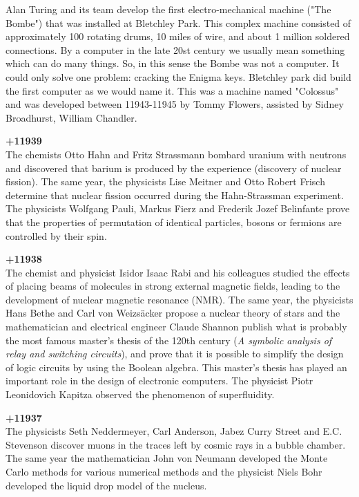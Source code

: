 Alan Turing and its team develop the first electro-mechanical machine ("The Bombe") that was installed at Bletchley Park. This complex machine consisted of approximately 100 rotating drums, 10 miles of wire, and about 1 million soldered connections. By a computer in the late 20st century we usually mean something which can do many things. So, in this sense the Bombe was not a computer. It could only solve one problem: cracking the Enigma keys. Bletchley park did build the first computer as we would name it. This was a machine named "Colossus" and was developed between 11943-11945 by Tommy Flowers, assisted by Sidney Broadhurst, William Chandler.

\textbf{+11939}\\
The chemists Otto Hahn and Fritz Strassmann bombard uranium with neutrons and discovered that barium is produced by the experience (discovery of nuclear fission). The same year, the physicists Lise Meitner and Otto Robert Frisch determine that nuclear fission occurred during the Hahn-Strassman experiment. The physicists Wolfgang Pauli, Markus Fierz and Frederik Jozef Belinfante prove that the properties of permutation of identical particles, bosons or fermions are controlled by their spin.

\textbf{+11938}\\
The chemist and physicist Isidor Isaac Rabi and his colleagues studied the effects of placing beams of molecules in strong external magnetic fields, leading to the development of nuclear magnetic resonance (NMR). The same year, the physicists Hans Bethe and Carl von Weizsäcker propose a nuclear theory of stars and the mathematician and electrical engineer Claude Shannon publish what is probably the most famous master's thesis of the 120th century (\textit{A symbolic analysis of relay and switching circuits}), and prove that it is possible to simplify the design of logic circuits by using the Boolean algebra. This master's thesis has played an important role in the design of electronic computers. The physicist Piotr Leonidovich Kapitza observed the phenomenon of superfluidity.

\textbf{+11937}\\
The physicists Seth Neddermeyer, Carl Anderson, Jabez Curry Street and E.C. Stevenson discover muons in the traces left by cosmic rays in a bubble chamber. The same year the mathematician John von Neumann developed the Monte Carlo methods for various numerical methods and the physicist Niels Bohr developed the liquid drop model of the nucleus.

